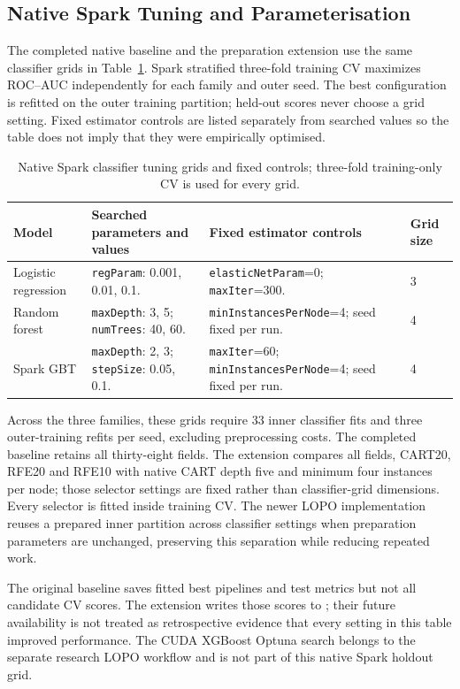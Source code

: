 \subsection{Native Spark Tuning and Parameterisation}
\label{subsec:native-spark-tuning}
The completed native baseline and the preparation extension use the same classifier grids in Table~\ref{tab:spark-tuning-grid}. Spark stratified three-fold training CV maximizes ROC--AUC independently for each family and outer seed. The best configuration is refitted on the outer training partition; held-out scores never choose a grid setting. Fixed estimator controls are listed separately from searched values so the table does not imply that they were empirically optimised.

\begin{table}[H]
\centering\small
\caption{Native Spark classifier tuning grids and fixed controls; three-fold training-only CV is used for every grid.}
\label{tab:spark-tuning-grid}
\begin{tabularx}{\textwidth}{@{}p{2.5cm}XXp{1cm}@{}}
\toprule
Model & Searched parameters and values & Fixed estimator controls & Grid size \\
\midrule
Logistic regression & \texttt{regParam}: 0.001, 0.01, 0.1. & \texttt{elasticNetParam}=0; \texttt{maxIter}=300. & 3 \\
Random forest & \texttt{maxDepth}: 3, 5; \texttt{numTrees}: 40, 60. & \texttt{minInstancesPerNode}=4; seed fixed per run. & 4 \\
Spark GBT & \texttt{maxDepth}: 2, 3; \texttt{stepSize}: 0.05, 0.1. & \texttt{maxIter}=60; \texttt{minInstancesPerNode}=4; seed fixed per run. & 4 \\
\bottomrule
\end{tabularx}
\end{table}

Across the three families, these grids require 33 inner classifier fits and three outer-training refits per seed, excluding preprocessing costs. The completed baseline retains all thirty-eight fields. The extension compares all fields, CART20, RFE20 and RFE10 with native CART depth five and minimum four instances per node; those selector settings are fixed rather than classifier-grid dimensions. Every selector is fitted inside training CV. The newer LOPO implementation reuses a prepared inner partition across classifier settings when preparation parameters are unchanged, preserving this separation while reducing repeated work.

The original baseline saves fitted best pipelines and test metrics but not all candidate CV scores. The extension writes those scores to ; their future availability is not treated as retrospective evidence that every setting in this table improved performance. The CUDA XGBoost Optuna search belongs to the separate research LOPO workflow and is not part of this native Spark holdout grid.
